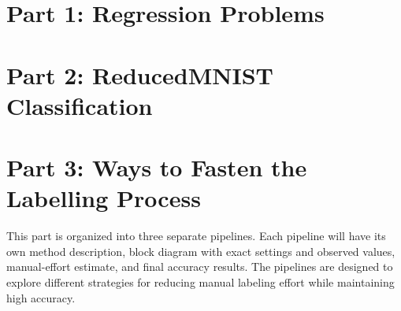 
\newpage

\section{Part 1: Regression Problems}

\newpage

\newpage

\section{Part 2: ReducedMNIST Classification}

\newpage

\section{Part 3: Ways to Fasten the Labelling Process}
This part is organized into three separate pipelines. Each pipeline will have its own method description, block diagram with exact settings and observed values, manual-effort estimate, and final accuracy results. The pipelines are designed to explore different strategies for reducing manual labeling effort while maintaining high accuracy.

\newpage

\newpage

\newpage

\newpage
